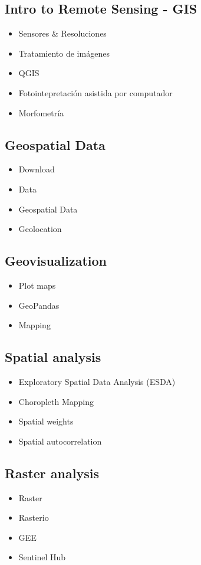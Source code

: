 \documentclass[a4paper,twoside,11pt,]{article}
\begin{document}
\subsection{Intro to Remote Sensing - GIS}
\begin{itemize}
    \item Sensores \& Resoluciones
    \item Tratamiento de imágenes
    \item QGIS
    \item Fotointepretación asistida por computador
    \item Morfometría
\end{itemize}

\subsection{Geospatial Data}
\begin{itemize}
    \item Download
    \item Data
    \item Geospatial Data
    \item Geolocation
\end{itemize}

\subsection{Geovisualization}
\begin{itemize}
    \item Plot maps
    \item GeoPandas
    \item Mapping
\end{itemize}

\subsection{Spatial analysis}
\begin{itemize}
    \item Exploratory Spatial Data Analysis (ESDA)
    \item Choropleth Mapping
    \item Spatial weights
    \item Spatial autocorrelation
\end{itemize}

\subsection{Raster analysis}
\begin{itemize}
    \item Raster
    \item Rasterio
    \item GEE
    \item Sentinel Hub
\end{itemize}
\end{document}
